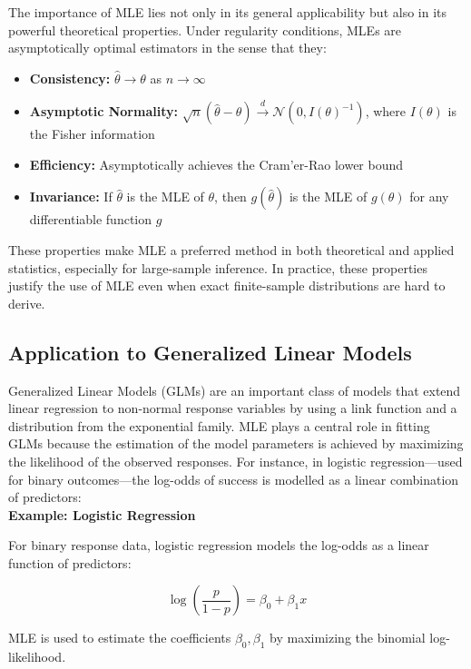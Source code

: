 \documentclass{book}
\begin{document}
The importance of MLE lies not only in its general applicability but also in its powerful theoretical properties. 
Under regularity conditions, MLEs are asymptotically optimal estimators in the sense that they:
\begin{itemize}
\item \textbf{Consistency:} $\hat{\theta} \to \theta$ as $n \to \infty$
\item \textbf{Asymptotic Normality:} $\sqrt{n}(\hat{\theta} - \theta) \xrightarrow{d} \mathcal{N}(0, I(\theta)^{-1})$, where $I(\theta)$ is the Fisher information
\item \textbf{Efficiency:} Asymptotically achieves the Cram'er-Rao lower bound
\item \textbf{Invariance:} If $\hat{\theta}$ is the MLE of $\theta$, then $g(\hat{\theta})$ is the MLE of $g(\theta)$ for any differentiable function $g$
\end{itemize}
These properties make MLE a preferred method in both theoretical and applied statistics, especially for large-sample inference. 
In practice, these properties justify the use of MLE even when exact finite-sample distributions are hard to derive.

\subsection{Application to Generalized Linear Models}

Generalized Linear Models (GLMs) are an important class of models that extend linear regression to non-normal response variables by using a link function and a distribution from the exponential family. MLE plays a central role in fitting GLMs because the estimation of the model parameters is achieved by maximizing the likelihood of the observed responses.
For instance, in logistic regression---used for binary outcomes---the log-odds of success is modelled as a linear combination of predictors:\\

\textbf{Example: Logistic Regression}

For binary response data, logistic regression models the log-odds as a linear function of predictors:

\[
\log\left( \frac{p}{1 - p} \right) = \beta_0 + \beta_1 x
\]

MLE is used to estimate the coefficients $\beta_0, \beta_1$ by maximizing the binomial log-likelihood.



\newpage
\end{document}
